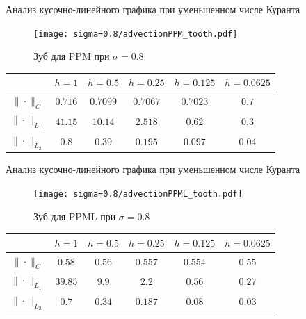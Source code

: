 \documentclass[unicode, 8pt]{beamer}
\begin{document}
    \begin{frame}{Анализ кусочно-линейного графика при уменьшенном числе Куранта}
        \begin{figure}[h]
            \centering
            \texttt{[image: sigma=0.8/advectionPPM\_tooth.pdf]}
            \caption{Зуб для PPM при $ \sigma = 0.8 $}
            \label{fig:ppm_tooth_08}
        \end{figure}
        \begin{center}
            \begin{tabular}{ |c|c|c|c|c|c| } 
             \hline
             & $ h=1 $ &  $ h=0.5$ &  $ h=0.25 $ &  $ h=0.125 $ &  $ h=0.0625 $ \\ 
             \hline 
             $\| \cdot \|_{C}$ & $0.716$ & $0.7099$ & $0.7067$ & $0.7023$ & $0.7$
             \\
             \hline
             $\| \cdot \|_{L_1}$ & $41.15$ & $10.14$ & $2.518$ & $0.62$ & $0.3$
             \\
             \hline
             $\| \cdot \|_{L_2}$ & $0.8$ & $0.39$ & $0.195$ & $0.097$ & $0.04$
             \\
             \hline
            \end{tabular}
        \end{center}
    \end{frame}

    \begin{frame}{Анализ кусочно-линейного графика при уменьшенном числе Куранта}
        \begin{figure}[h]
            \centering
            \texttt{[image: sigma=0.8/advectionPPML\_tooth.pdf]}
            \caption{Зуб для PPML при $ \sigma = 0.8 $}
            \label{fig:ppml_tooth_08}
        \end{figure}
        \begin{center}
            \begin{tabular}{ |c|c|c|c|c|c| } 
             \hline
             & $ h=1 $ &  $ h=0.5$ &  $ h=0.25 $ &  $ h=0.125 $ &  $ h=0.0625 $ 
             \\ 
             \hline
             $\| \cdot \|_{C}$ & $0.58$ & $0.56$ & $0.557$ & $0.554$ & $0.55$ 
             \\
             \hline
             $\| \cdot \|_{L_1}$ & $39.85$ & $9.9$ & $2.2$ & $0.56$ & $0.27$
             \\
             \hline
             $\| \cdot \|_{L_2}$ & $0.7$ & $0.34$ & $0.187$ & $0.08$ & $0.03$ 
             \\
             \hline
            \end{tabular}
        \end{center}
    \end{frame}
\end{document}
